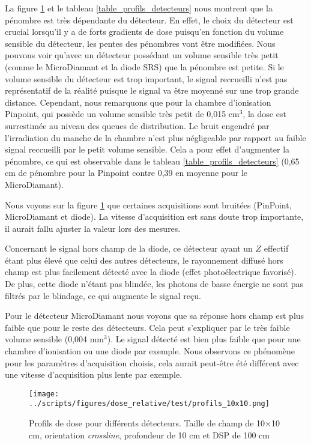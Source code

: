 \documentclass{book}
\begin{document}
La figure \ref*{fig_profils_detecteurs} et le tableau \ref{table_profils_detecteurs} nous montrent que la pénombre est très dépendante du détecteur. En effet, le choix du détecteur est crucial lorsqu'il y a de forts gradients de dose puisqu'en fonction du volume sensible du détecteur, les pentes des pénombres vont être modifiées. Nous pouvons voir qu'avec un détecteur possédant un volume sensible très petit (comme le MicroDiamant et la diode SRS) que la pénombre est petite. Si le volume sensible du détecteur est trop important, le signal reccueilli n'est pas représentatif de la réalité puisque le signal va être moyenné sur une trop grande distance. Cependant, nous remarquons que pour la chambre d'ionisation Pinpoint, qui possède un volume sensible très petit de 0,015 cm$^3$, la dose est surrestimée au niveau des queues de distribution. Le bruit engendré par l'irradiation du manche de la chambre n'est plus négligeable par rapport au faible signal reccueilli par le petit volume sensible. Cela a pour effet d'augmenter la pénombre, ce qui est observable dans le tableau \ref{table_profils_detecteurs} (0,65 cm de pénombre pour la Pinpoint contre 0,39 en moyenne pour le MicroDiamant).

Nous voyons sur la figure \ref*{fig_profils_detecteurs} que certaines acquisitions sont bruitées (PinPoint, MicroDiamant et diode). La vitesse d'acquisition est sans doute trop importante, il aurait fallu ajuster la valeur lors des mesures.

Concernant le signal hors champ de la diode, ce détecteur ayant un $Z$ effectif étant plus élevé que celui des autres détecteurs, le rayonnement diffusé hors champ est plus facilement détecté avec la diode (effet photoélectrique favorisé). De plus, cette diode n'étant pas blindée, les photons de basse énergie ne sont pas filtrés par le blindage, ce qui augmente le signal reçu.

Pour le détecteur MicroDiamant nous voyons que sa réponse hors champ est plus faible que pour le reste des détecteurs. Cela peut s'expliquer par le très faible volume sensible (0,004 mm$^3$). Le signal détecté est bien plus faible que pour une chambre d'ionisation ou une diode par exemple. Nous observons ce phénomène pour les paramètres d'acquisition choisis, cela aurait peut-être été différent avec une vitesse d'acquisition plus lente par exemple.

\begin{figure}[h]
  \centering
  \texttt{[image: ../scripts/figures/dose\_relative/test/profils\_10x10.png]}
  \caption{Profils de dose pour différents détecteurs. Taille de champ de 10$\times$10 cm, orientation \textit{crossline}, profondeur de 10 cm et DSP de 100 cm}
  \label{fig_profils_detecteurs}
\end{figure}
\end{document}
